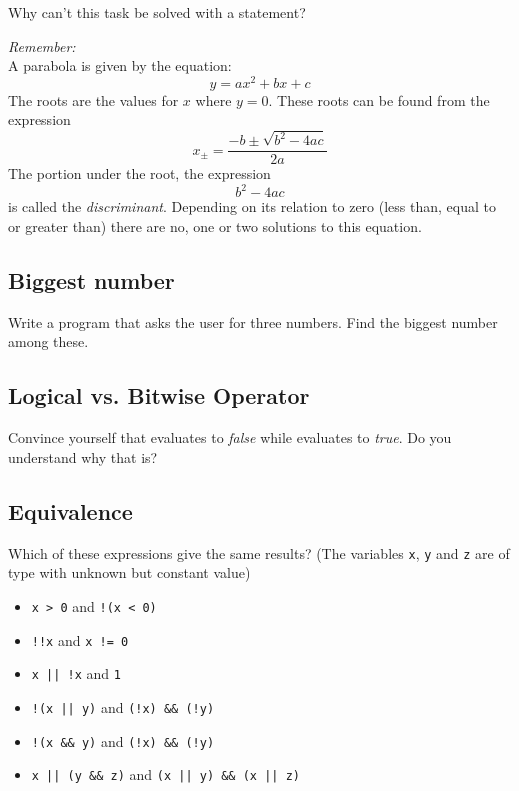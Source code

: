 Why can't this task be solved with a  statement?

\emph{Remember:}\\
A parabola is given by the equation:
\[ y = ax^2 + bx + c \]
The roots are the values for $x$ where $y = 0$. These roots can be found from the expression
\[ x_{\pm} = \dfrac{-b \pm \sqrt{b^2 - 4ac}}{2a} \]
The portion under the root, \ie the expression
\[ b^2 - 4ac \]
is called the \emph{discriminant}. Depending on its relation to zero (less than, equal to or greater than) there are no, one or two solutions to this equation.

\subsection*{Biggest number}
Write a program that asks the user for three numbers. Find the biggest number among these.

\subsection*{Logical vs. Bitwise Operator}
Convince yourself that  evaluates to \emph{false} while  evaluates to \emph{true}. Do you understand why that is?

\subsection*{Equivalence}
Which of these expressions give the same results? (The variables \texttt{x}, \texttt{y} and \texttt{z} are of type  with unknown but constant value)
\begin{itemize}
\item \texttt{x > 0} and \texttt{!(x < 0)}
\item \texttt{!!x} and \texttt{x != 0}
\item \texttt{x || !x} and \texttt{1}
\item \texttt{!(x || y)} and \texttt{(!x) \&\& (!y)}
\item \texttt{!(x \&\& y)} and \texttt{(!x) \&\& (!y)}
\item \texttt{x || (y \&\& z)} and \texttt{(x || y) \&\& (x || z)}
\end{itemize}
\vfill

